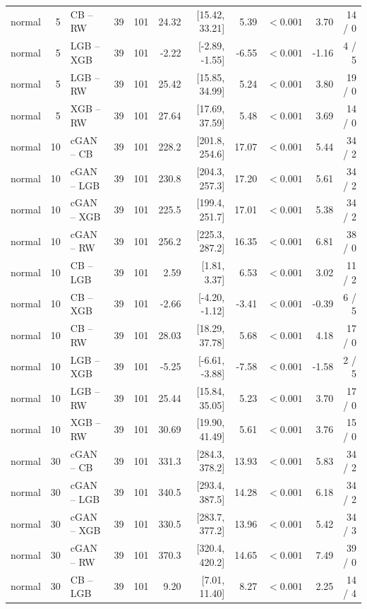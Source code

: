 \documentclass[11pt,a4paper]{article}
\begin{document}
{\begin{longtable}{lrlrrrrrrrr}
normal & 5 & CB -- RW & 39 & 101 & 24.32 & [15.42, 33.21] & 5.39 & $<0.001$ & 3.70 & 14 / 0 \\
normal & 5 & LGB -- XGB & 39 & 101 & -2.22 & [-2.89, -1.55] & -6.55 & $<0.001$ & -1.16 & 4 / 5 \\
normal & 5 & LGB -- RW & 39 & 101 & 25.42 & [15.85, 34.99] & 5.24 & $<0.001$ & 3.80 & 19 / 0 \\
normal & 5 & XGB -- RW & 39 & 101 & 27.64 & [17.69, 37.59] & 5.48 & $<0.001$ & 3.69 & 14 / 0 \\
\addlinespace
normal & 10 & cGAN -- CB & 39 & 101 & 228.2 & [201.8, 254.6] & 17.07 & $<0.001$ & 5.44 & 34 / 2 \\
normal & 10 & cGAN -- LGB & 39 & 101 & 230.8 & [204.3, 257.3] & 17.20 & $<0.001$ & 5.61 & 34 / 2 \\
normal & 10 & cGAN -- XGB & 39 & 101 & 225.5 & [199.4, 251.7] & 17.01 & $<0.001$ & 5.38 & 34 / 2 \\
normal & 10 & cGAN -- RW & 39 & 101 & 256.2 & [225.3, 287.2] & 16.35 & $<0.001$ & 6.81 & 38 / 0 \\
normal & 10 & CB -- LGB & 39 & 101 & 2.59 & [1.81, 3.37] & 6.53 & $<0.001$ & 3.02 & 11 / 2 \\
normal & 10 & CB -- XGB & 39 & 101 & -2.66 & [-4.20, -1.12] & -3.41 & $<0.001$ & -0.39 & 6 / 5 \\
normal & 10 & CB -- RW & 39 & 101 & 28.03 & [18.29, 37.78] & 5.68 & $<0.001$ & 4.18 & 17 / 0 \\
normal & 10 & LGB -- XGB & 39 & 101 & -5.25 & [-6.61, -3.88] & -7.58 & $<0.001$ & -1.58 & 2 / 5 \\
normal & 10 & LGB -- RW & 39 & 101 & 25.44 & [15.84, 35.05] & 5.23 & $<0.001$ & 3.70 & 17 / 0 \\
normal & 10 & XGB -- RW & 39 & 101 & 30.69 & [19.90, 41.49] & 5.61 & $<0.001$ & 3.76 & 15 / 0 \\
\addlinespace
normal & 30 & cGAN -- CB & 39 & 101 & 331.3 & [284.3, 378.2] & 13.93 & $<0.001$ & 5.83 & 34 / 2 \\
normal & 30 & cGAN -- LGB & 39 & 101 & 340.5 & [293.4, 387.5] & 14.28 & $<0.001$ & 6.18 & 34 / 2 \\
normal & 30 & cGAN -- XGB & 39 & 101 & 330.5 & [283.7, 377.2] & 13.96 & $<0.001$ & 5.42 & 34 / 3 \\
normal & 30 & cGAN -- RW & 39 & 101 & 370.3 & [320.4, 420.2] & 14.65 & $<0.001$ & 7.49 & 39 / 0 \\
normal & 30 & CB -- LGB & 39 & 101 & 9.20 & [7.01, 11.40] & 8.27 & $<0.001$ & 2.25 & 14 / 4 \\

\end{longtable}}
\end{document}
